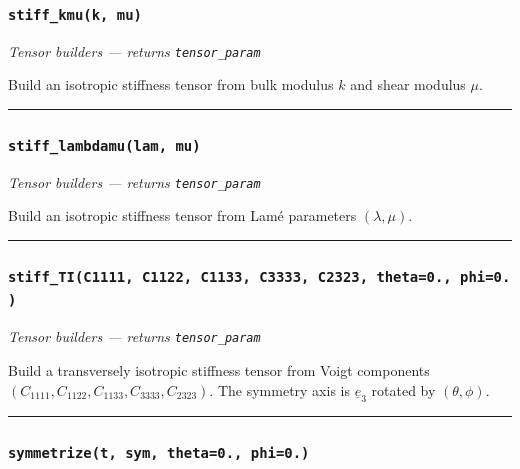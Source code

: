 \documentclass[
  a4paper,
  numbers=noendperiod,
  DIV=12]{scrreprt}
\newcommand{\uv}[1]{{\underline{{#1}}}}
\begin{document}
\subsubsection{\texorpdfstring{\texttt{stiff\_kmu(k,\ mu)}}{stiff\_kmu(k, mu)}}\label{api-stiff-kmu}

\emph{Tensor builders --- returns \texttt{tensor\_param}}

Build an isotropic stiffness tensor from bulk modulus \(k\) and shear
modulus \(\mu\).

\begin{center}\rule{0.5\linewidth}{0.5pt}\end{center}

\subsubsection{\texorpdfstring{\texttt{stiff\_lambdamu(lam,\ mu)}}{stiff\_lambdamu(lam, mu)}}\label{api-stiff-lambdamu}

\emph{Tensor builders --- returns \texttt{tensor\_param}}

Build an isotropic stiffness tensor from Lamé parameters
\((\lambda, \mu)\).

\begin{center}\rule{0.5\linewidth}{0.5pt}\end{center}

\subsubsection{\texorpdfstring{\texttt{stiff\_TI(C1111,\ C1122,\ C1133,\ C3333,\ C2323,\ theta=0.,\ phi=0.)}}{stiff\_TI(C1111, C1122, C1133, C3333, C2323, theta=0., phi=0.)}}\label{api-stiff-TI}

\emph{Tensor builders --- returns \texttt{tensor\_param}}

Build a transversely isotropic stiffness tensor from Voigt components
\((C_{1111}, C_{1122}, C_{1133}, C_{3333}, C_{2323})\). The symmetry
axis is \(\uv{e}_3\) rotated by \((\theta,\phi)\).

\begin{center}\rule{0.5\linewidth}{0.5pt}\end{center}

\subsubsection{\texorpdfstring{\texttt{symmetrize(t,\ sym,\ theta=0.,\ phi=0.)}}{symmetrize(t, sym, theta=0., phi=0.)}}\label{api-symmetrize}
\end{document}

